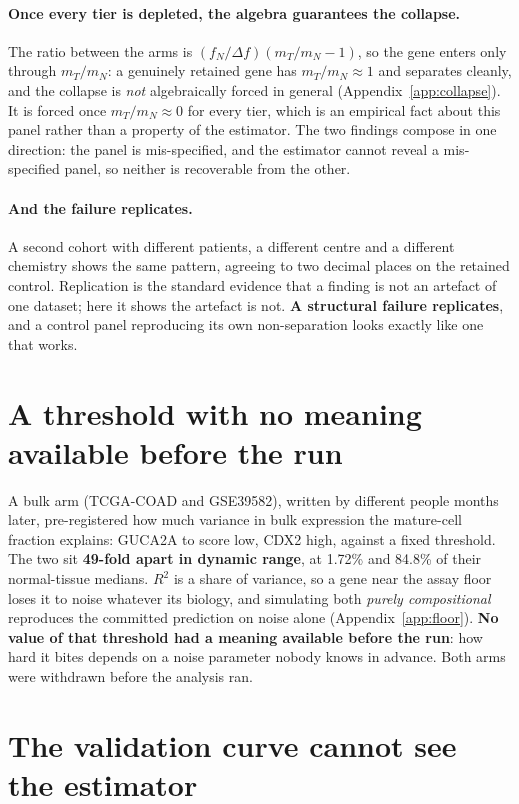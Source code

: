 \documentclass{article}
\begin{document}
\paragraph{Once every tier is depleted, the algebra guarantees the collapse.}
The ratio between the arms is $(f_N/\Delta f)(m_T/m_N - 1)$, so the gene enters
only through $m_T/m_N$: a genuinely retained gene has $m_T/m_N \approx 1$ and
separates cleanly, and the collapse is \emph{not} algebraically forced in
general (Appendix~\ref{app:collapse}). It is forced once $m_T/m_N \approx 0$ for
every tier, which is an empirical fact about this panel rather than a property
of the estimator. The two findings compose in one direction: the panel is
mis-specified, and the estimator cannot reveal a mis-specified panel, so neither
is recoverable from the other.

\paragraph{And the failure replicates.} A second cohort with different patients,
a different centre and a different chemistry shows the same pattern, agreeing to
two decimal places on the retained control. Replication is the standard evidence
that a finding is not an artefact of one dataset; here it shows the artefact is
not. \textbf{A structural failure replicates}, and a control panel reproducing
its own non-separation looks exactly like one that works.

\section{A threshold with no meaning available before the run}
\label{sec:floor}

A bulk arm (TCGA-COAD and GSE39582), written by different people months later,
pre-registered how much variance in bulk expression the mature-cell fraction
explains: GUCA2A to score low, CDX2 high, against a fixed threshold. The two sit
\textbf{49-fold apart in dynamic range}, at 1.72\% and 84.8\% of their
normal-tissue medians. $R^2$ is a share of variance, so a gene near the assay
floor loses it to noise whatever its biology, and simulating both \emph{purely
compositional} reproduces the committed prediction on noise alone
(Appendix~\ref{app:floor}). \textbf{No value of that threshold had a meaning
available before the run}: how hard it bites depends on a noise parameter nobody
knows in advance. Both arms were withdrawn before the analysis ran.

\section{The validation curve cannot see the estimator}
\label{sec:oracle}
\end{document}
